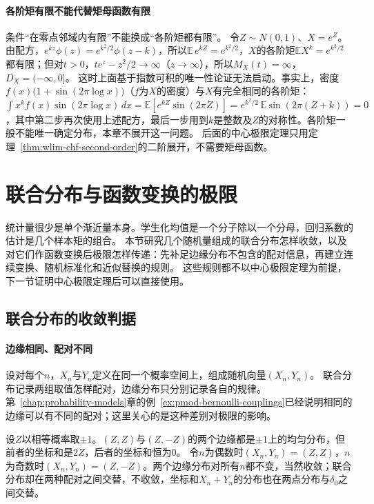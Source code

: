 \paragraph{各阶矩有限不能代替矩母函数有限}
条件“在零点邻域内有限”不能换成“各阶矩都有限”。
令$Z\sim N(0,1)$、$X=e^Z$。由配方，$e^{kz}\phi(z)=e^{k^2/2}\phi(z-k)$，所以$\mathbb E\,e^{kZ}=e^{k^2/2}$，$X$的各阶矩$\mathbb E X^k=e^{k^2/2}$都有限；但对$t>0$，$te^z-z^2/2\to\infty$（$z\to\infty$），所以$M_X(t)=\infty$，$D_X=(-\infty,0]$。
这时上面基于指数可积的唯一性论证无法启动。事实上，密度$f(x)\bigl(1+\sin(2\pi\log x)\bigr)$（$f$为$X$的密度）与$X$有完全相同的各阶矩：$\int x^kf(x)\sin(2\pi\log x)\,dx=\mathbb E[e^{kZ}\sin(2\pi Z)]=e^{k^2/2}\,\mathbb E\sin(2\pi(Z+k))=0$，其中第二步再次使用上述配方，最后一步用到$k$是整数及$Z$的对称性。各阶矩一般不能唯一确定分布，本章不展开这一问题。
后面的中心极限定理只用定理~\ref{thm:wlim-chf-second-order}的二阶展开，不需要矩母函数。

\section{联合分布与函数变换的极限}
\label{sec:wlim-joint-transform}

统计量很少是单个渐近量本身。学生化均值是一个分子除以一个分母，回归系数的估计是几个样本矩的组合。
本节研究几个随机量组成的联合分布怎样收敛，以及对它们作函数变换后极限怎样传递：先补足边缘分布不包含的配对信息，再建立连续变换、随机标准化和近似替换的规则。
这些规则都不以中心极限定理为前提，下一节证明中心极限定理后可以直接使用。

\subsection{联合分布的收敛判据}

\paragraph{边缘相同、配对不同}
设对每个$n$，$X_n$与$Y_n$定义在同一个概率空间上，组成随机向量$(X_n,Y_n)$。
联合分布记录两组取值怎样配对，边缘分布只分别记录各自的规律。第~\ref{chap:probability-models}章的例~\ref{ex:pmod-bernoulli-couplings}已经说明相同的边缘可以有不同的配对；这里关心的是这种差别对极限的影响。

\begin{example}[交替配对]
\label{ex:wlim-alternating-pairing}
设$Z$以相等概率取$\pm1$。$(Z,Z)$与$(Z,-Z)$的两个边缘都是$\pm1$上的均匀分布，但前者的坐标和是$2Z$，后者的坐标和恒为$0$。
令$n$为偶数时$(X_n,Y_n)=(Z,Z)$，$n$为奇数时$(X_n,Y_n)=(Z,-Z)$。两个边缘分布对所有$n$都不变，当然收敛；联合分布却在两种配对之间交替，不收敛，坐标和$X_n+Y_n$的分布也在两点分布与$\delta_0$之间交替。
\end{example}


